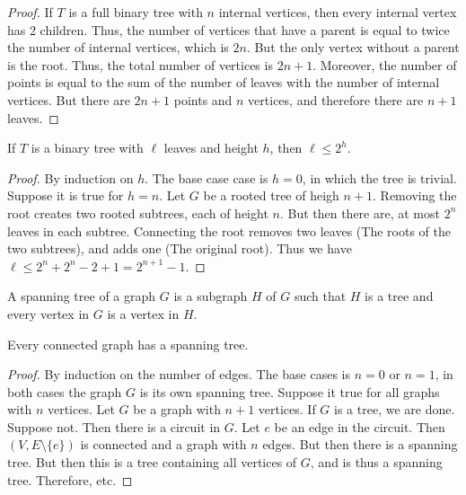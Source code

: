         \begin{proof}
            If $T$ is a full binary tree with $n$ internal vertices,
            then every internal vertex has 2 children. Thus, the
            number of vertices that have a parent is equal to twice
            the number of internal vertices, which is $2n$. But the
            only vertex without a parent is the root. Thus, the
            total number of vertices is $2n+1$. Moreover, the number
            of points is equal to the sum of the number of leaves
            with the number of internal vertices. But there are
            $2n+1$ points and $n$ vertices, and therefore there
            are $n+1$ leaves.
        \end{proof}
        \begin{theorem}
            If $T$ is a binary tree with $\ell$ leaves and height
            $h$, then $\ell\leq2^{h}$.
        \end{theorem}
        \begin{proof}
            By induction on $h$. The base case case is $h=0$, in
            which the tree is trivial. Suppose it is true for
            $h=n$. Let $G$ be a rooted tree of heigh $n+1$.
            Removing the root creates two rooted subtrees,
            each of height $n$. But then there are, at most
            $2^{n}$ leaves in each subtree. Connecting the root
            removes two leaves (The roots of the two subtrees),
            and adds one (The original root). Thus we have
            $\ell\leq{2^{n}+2^{n}-2+1}=2^{n+1}-1$.
        \end{proof}
        \begin{definition}
            A spanning tree of a graph $G$ is a subgraph
            $H$ of $G$ such that $H$ is a tree and every
            vertex in $G$ is a vertex in $H$.
        \end{definition}
        \begin{theorem}
            Every connected graph has a spanning tree.
        \end{theorem}
        \begin{proof}
            By induction on the number of edges. The base cases
            is $n=0$ or $n=1$, in both cases the graph $G$ is its
            own spanning tree. Suppose it true for all graphs with
            $n$ vertices. Let $G$ be a graph with $n+1$ vertices.
            If $G$ is a tree, we are done. Suppose not. Then there
            is a circuit in $G$. Let $e$ be an edge in the circuit.
            Then $(V,E\setminus\{e\})$ is connected and a graph
            with $n$ edges. But then there is a spanning tree. But
            then this is a tree containing all vertices of $G$,
            and is thus a spanning tree. Therefore, etc.
        \end{proof}
